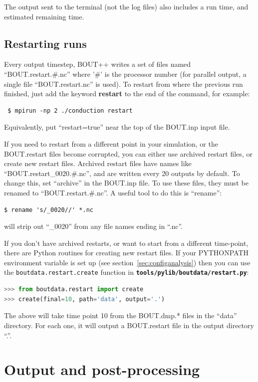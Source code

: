 \documentclass[12pt]{article}
\newcommand{\file}[1]{\texttt{\bf #1}}
\begin{document}
The output sent to the terminal (not the log files) also includes a run time, and estimated
remaining time.

\subsection{Restarting runs}
\label{sec:restarting}

Every output timestep, BOUT++ writes a set of files named ``BOUT.restart.\#.nc''
where '\#' is the processor number (for parallel output, a single file ``BOUT.restart.nc'' is used).
To restart from where the previous run finished, just add the keyword {\bf restart} to the end of the command, for example:
\begin{verbatim}
 $ mpirun -np 2 ./conduction restart
\end{verbatim}
Equivalently, put ``restart=true'' near the top of the BOUT.inp input file.

If you need to restart from a different point in your simulation, or the BOUT.restart files
become corrupted, you can either use archived restart files, or create new restart files.
Archived restart files have names like ``BOUT.restart\_0020.\#.nc'', and are written
every 20 outputs by default. To change this, set ``archive'' in the BOUT.inp file.
To use these files, they must be renamed to ``BOUT.restart.\#.nc''. A useful tool 
to do this is ``rename'':
\begin{verbatim}
$ rename 's/_0020//' *.nc
\end{verbatim}
will strip out ``\_0020'' from any file names ending in ``.nc''.

If you don't have archived restarts, or want to start from a different time-point, 
there are Python routines for creating new restart files. If your PYTHONPATH
environment variable is set up (see section~\ref{sec:configanalysis}) then you can use
the \lstinline!boutdata.restart.create! function in \file{tools/pylib/boutdata/restart.py}:

\begin{lstlisting}[language=python,numbers=none]
>>> from boutdata.restart import create
>>> create(final=10, path='data', output='.')
\end{lstlisting}
The above will take time point 10 from the BOUT.dmp.* files in the ``data'' directory.
For each one, it will output a BOUT.restart file in the output directory ``.''.

\section{Output and post-processing}
\label{sec:output}
\end{document}
